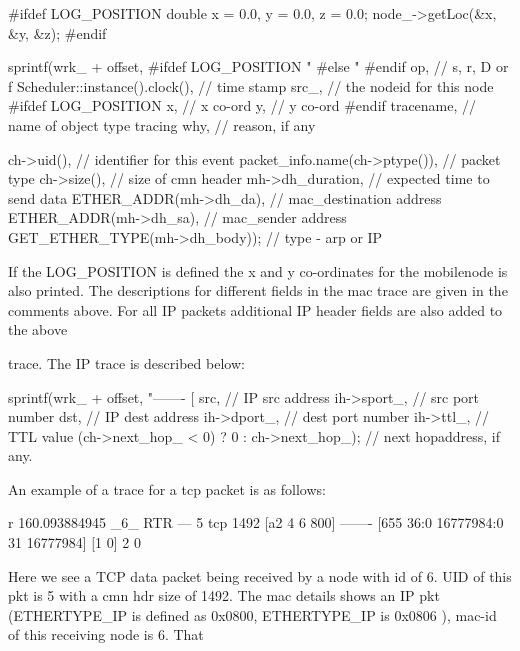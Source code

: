 \begin{program}
\#ifdef LOG_POSITION
        double x = 0.0, y = 0.0, z = 0.0;
        node_->getLoc(&x, &y, &z);
\#endif

	sprintf(wrk_ + offset,
\#ifdef LOG_POSITION
		"%
\#else
		"%
\#endif
		op,                    // s, r, D or f
		Scheduler::instance().clock(),  // time stamp
                src_,                  // the nodeid for this node
\#ifdef LOG_POSITION
                x,                     // x co-ord 
                y,                     // y co-ord
\#endif
		tracename,             // name of object type tracing
		why,                   // reason, if any

                ch->uid(),             // identifier for this event
		packet_info.name(ch->ptype()), // packet type
		ch->size(),                    // size of cmn header
		mh->dh_duration,       // expected time to send data 
		ETHER_ADDR(mh->dh_da), // mac_destination address
		ETHER_ADDR(mh->dh_sa),         // mac_sender address
		GET_ETHER_TYPE(mh->dh_body));  // type - arp or IP
\end{program}

If the LOG\_POSITION is defined the x and y co-ordinates for the mobilenode is also printed. The descriptions for different fields in the mac trace are given in the comments above. For all IP packets additional IP header fields are also added to the above











 trace. The IP trace is described below:
\begin{program}
sprintf(wrk_ + offset, "------- [%
		src,          // IP src address
		ih->sport_,   // src port number
		dst,          // IP dest address
		ih->dport_,   // dest port number
		ih->ttl_,     // TTL value 
		(ch->next_hop_ < 0) ? 0 : ch->next_hop_); // next hopaddress, if any.
\end{program}

An example of a trace for a tcp packet is as follows:
\begin{program}
r 160.093884945 _6_ RTR  --- 5 tcp 1492 [a2 4 6 800] ------- [655
36:0 16777984:0 31 16777984] [1 0] 2 0
\end{program}
Here we see a TCP data packet being received by a node with id of 6. UID of this pkt is 5 with a cmn hdr size of 1492. The mac details shows an IP pkt (ETHERTYPE\_IP is defined as 0x0800, ETHERTYPE\_IP is 0x0806 ), mac-id of this receiving node is 6. That












